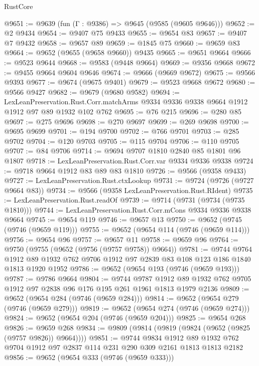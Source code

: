 \begin{lexlean}{RustCore}
\begin{coremodule}
@9651 := @9639 (fun (Γ : @9386) => @9645 (@9585 (@9605 @9646)))
@9652 := @2 @9434
@9654 := @9407 @75 @9433
@9655 := @9654 @83
@9657 := @9407 @7 @9432
@9658 := @9657 @89
@9659 := @1845 @75
@9660 := @9659 @83
@9664 := @9652 (@9655 (@9658 @9660)) @9435
@9665 := @9651 @9664
@9666 := @9523 @9644
@9668 := @9583 (@9448 @9664)
@9669 := @9356 @9668
@9672 := @9455 @9664 @9604 @9646
@9674 := @9666 (@9669 @9672)
@9675 := @9566 @9393
@9677 := @9674 (@9675 @9401)
@9679 := @9523 @9668 @9672
@9680 := @9566 @9427
@9682 := @9679 (@9680 @9582)
@9694 := LexLeanPreservation.Rust.Corr.matchArms
    @9334
    @9336
    @9338
    @9664
    @1912
    @1912
    @97
    @89
    @1932
    @102
    @762
@9695 := @76 @215
@9696 := @280 @85
@9697 := @275 @9696
@9698 := @270 @9697
@9699 := @269 @9698
@9700 := @9695 @9699
@9701 := @194 @9700
@9702 := @766 @9701
@9703 := @285 @9702
@9704 := @120 @9703
@9705 := @115 @9704
@9706 := @110 @9705
@9707 := @84 @9706
@9714 := @9694 @9707 @1810 @2840 @85 @1801 @96 @1807
@9718 := LexLeanPreservation.Rust.Corr.var @9334 @9336 @9338
@9724 := @9718 @9664 @1912 @83 @89 @83 @1810
@9726 := @9566 (@9358 @9433)
@9727 := LexLeanPreservation.Rust.ctxLookup
@9731 := @9724 (@9726 (@9727 @9664 @83))
@9734 := @9566 (@9358 LexLeanPreservation.Rust.RIdent)
@9735 := LexLeanPreservation.Rust.readOf
@9739 := @9714 (@9731 (@9734 (@9735 @1810)))
@9744 := LexLeanPreservation.Rust.Corr.mCons @9334 @9336 @9338 @9664
@9745 := @9654 @119
@9746 := @9657 @13
@9750 := @9652 (@9745 (@9746 (@9659 @119)))
@9755 := @9652 (@9654 @114 (@9746 (@9659 @114)))
@9756 := @9654 @96
@9757 := @9657 @11
@9758 := @9659 @96
@9764 := @9750 (@9755 (@9652 (@9756 (@9757 @9758)) @9664))
@9781 := @9744
    @9764
    @1912
    @89
    @1932
    @762
    @9706
    @1912
    @97
    @2839
    @83
    @108
    @123
    @186
    @1840
    @1813
    @1920
    @1952
@9786 := @9652 (@9654 @193 (@9746 (@9659 @193)))
@9787 := @9786 @9664
@9804 := @9744
    @9787
    @1912
    @89
    @1932
    @762
    @9705
    @1912
    @97
    @2838
    @96
    @176
    @195
    @261
    @1961
    @1813
    @1979
    @2136
@9809 := @9652 (@9654 @284 (@9746 (@9659 @284)))
@9814 := @9652 (@9654 @279 (@9746 (@9659 @279)))
@9819 := @9652 (@9654 @274 (@9746 (@9659 @274)))
@9824 := @9652 (@9654 @204 (@9746 (@9659 @204)))
@9825 := @9654 @268
@9826 := @9659 @268
@9834 := @9809 (@9814 (@9819 (@9824 (@9652 (@9825 (@9757 @9826)) @9664))))
@9851 := @9744
    @9834
    @1912
    @89
    @1932
    @762
    @9704
    @1912
    @97
    @2837
    @114
    @231
    @290
    @309
    @2161
    @1813
    @1813
    @2182
@9856 := @9652 (@9654 @333 (@9746 (@9659 @333)))

\end{coremodule}
\end{lexlean}
